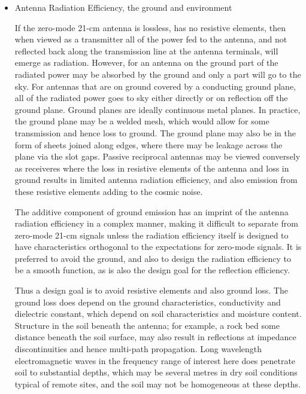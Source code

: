 \begin{itemize}
   \item
   Antenna Radiation Efficiency, the ground and environment
   
   If the zero-mode 21-cm antenna is lossless, has no resistive elements, then when viewed as a transmitter all of the power fed to the antenna, and not reflected back along the transmission line at the antenna terminals, will emerge as radiation.  However, for an antenna on the ground part of the radiated power may be absorbed by the ground and only a part will go to the sky.  For antennas that are on ground covered by a conducting ground plane, all of the radiated power goes to sky either directly or on reflection off the ground plane. Ground planes are ideally continuous metal planes.  In practice, the ground plane may be a welded mesh, which would allow for some transmission and hence loss to ground.  The ground plane may also be in the form of sheets joined along edges, where there may be leakage across the plane via the slot gaps.  Passive reciprocal antennas may be viewed conversely as receiveres where the loss in resistive elements of the antenna and loss in ground results in limited antenna radiation efficiency, and also emission from these resistive elements adding to the cosmic noise.  
   
   The additive component of ground emission has an imprint of the antenna radiation efficiency in a complex manner, making it difficult to separate from zero-mode 21-cm signals unless the radiation efficiency itself is designed to have characteristics orthogonal to the expectations for zero-mode signals.  It is preferred to avoid the ground, and also to design the radiation efficiency to be a smooth function, as is also the design goal for the reflection efficiency.
   
   Thus a design goal is to avoid resistive elements and also ground loss.  The ground loss does depend on the ground characteristics, conductivity and dielectric constant, which depend on soil characteristics and moisture content.  Structure in the soil beneath the antenna; for example, a rock bed some distance beneath the soil surface, may also result in reflections at impedance discontinuities and hence multi-path propagation.  Long wavelength electromagnetic waves in the frequency range of interest here does penetrate soil to substantial depths, which may be several metres in dry soil conditions typical of remote sites, and the soil may not be homogeneous at these depths.
   

\end{itemize}
